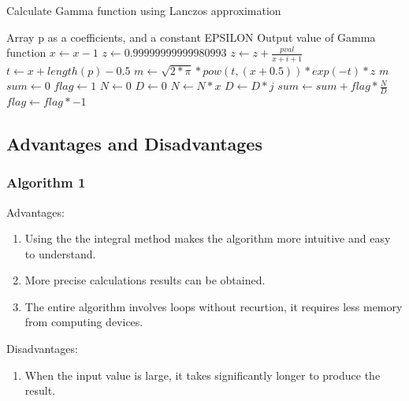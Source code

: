 \documentclass{report}
\begin{document}
\begin{algorithm} 
	\caption{Calculate Gamma function using Lanczos approximation} 
	\begin{algorithmic}[1]
	\begin{footnotesize}
		\Require Array p as a coefficients, and a constant EPSILON
		\Ensure Output value of Gamma function
			\State {}
		\EndIf
			\State {}
		\Else
			\State $x \gets x-1$
			\State $z \gets 0.99999999999980993$
				\State $ z \gets z+\frac{pval}{x+i+1} $
			\EndFor
			\State $t \gets x+length \left (p \right)-0.5$
			\State $m \gets \sqrt{2*\pi }*pow\left ( t,\left ( x+0.5 \right )  \right ) *exp\left ( -t \right ) *z$
		\EndIf
		\State \Return $m$
		\EndFunction
		\State
			\State $sum \gets 0$
			\State $flag \gets 1$
					\State $N \gets 0$
					\State $D \gets 0$
						\State $N \gets N * x$
						\State $D \gets D * j$
					\EndFor
					\State $sum \gets sum + flag * \frac{N}{D}$
				\State $flag \gets flag * -1$
				\EndIf
			\EndFor	
		\EndFunction
	\end{footnotesize}
	\end{algorithmic}
\end{algorithm}
\clearpage
\subsection{Advantages and Disadvantages}
\subsubsection{Algorithm 1}
Advantages:
\begin{enumerate}
\item Using the the integral method makes the algorithm more intuitive and easy to understand.
\item More precise calculations results can be obtained.
\item The entire algorithm involves loops without recurtion, it requires less memory from computing devices.
\end{enumerate}
Disadvantages:
\begin{enumerate}
\item When the input value is large, it takes significantly longer to produce the result.
\end{enumerate}
\end{document}
